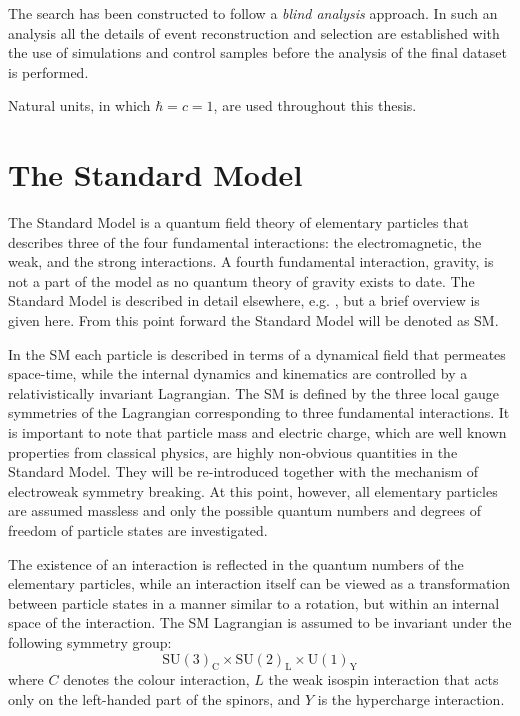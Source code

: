 
The search has been constructed to follow a {\it blind analysis} approach. In such an analysis
all the details of event reconstruction and selection are established 
with the use of simulations and control samples before
the analysis of the final dataset is performed.

Natural units, in which $\hbar=c=1$, are used throughout this thesis.


\section{The Standard Model}

The Standard Model is a quantum field theory of elementary particles that describes 
three of the four fundamental interactions: 
the electromagnetic, the weak, and the strong interactions. A fourth fundamental
interaction, gravity, 
is not a part of the model as no quantum theory of gravity exists to date. 
The Standard Model is described in detail elsewhere, e.g. \cite{Glashow:1961tr,Salam:1968rm,Tully:1417476}, 
but a brief overview is given here. From this point forward the Standard Model will be denoted as SM.

In the SM each particle is described
in terms of a dynamical field that permeates space-time, while the internal dynamics 
and kinematics are controlled by a relativistically invariant Lagrangian.
The SM is defined by the three local gauge symmetries of the Lagrangian
corresponding to three fundamental interactions.
It is important to note that particle mass and electric charge, 
which are well known properties from 
classical physics, are highly non-obvious quantities in the Standard Model. They
will be re-introduced together with the mechanism of electroweak symmetry breaking. At this point, however,
all elementary particles are assumed massless and only the possible quantum numbers
and degrees of freedom of particle states are investigated.

The existence of an interaction is reflected in the quantum numbers of the elementary
particles, while an interaction itself can be viewed as a transformation between particle states
in a manner similar to a rotation, but within an internal space of the interaction.
The SM Lagrangian is assumed to be invariant under the following symmetry group:
\begin{equation}
\text{SU}(3)_\text{C} \times \text{SU}(2)_\text{L} \times \text{U}(1)_\text{Y}
\label{eqn:symSM}
\end{equation}
where $C$ denotes the colour interaction, $L$ the weak isospin interaction 
that acts only on the left-handed part of the spinors, and $Y$ is the hypercharge
interaction.

